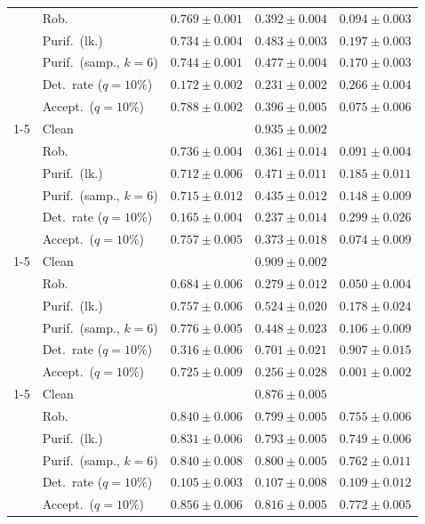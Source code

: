 \begin{tabular}{@{}llrrr@{}}
 & Rob. & $0.769 \pm 0.001$ & $0.392 \pm 0.004$ & $0.094 \pm 0.003$ \\
 & Purif.\ (lk.) & $0.734 \pm 0.004$ & $0.483 \pm 0.003$ & $0.197 \pm 0.003$ \\
 & Purif.\ (samp., $k{=}6$) & $0.744 \pm 0.001$ & $0.477 \pm 0.004$ & $0.170 \pm 0.003$ \\
 & Det.\ rate ($q{=}10\%$) & $0.172 \pm 0.002$ & $0.231 \pm 0.002$ & $0.266 \pm 0.004$ \\
 & Accept.\ ($q{=}10\%$) & $0.788 \pm 0.002$ & $0.396 \pm 0.005$ & $0.075 \pm 0.006$ \\
\cmidrule(lr){1-5}
\multirow{6}{*}{$\alpha{=}0.5$} & Clean & \multicolumn{3}{c}{$0.935 \pm 0.002$} \\
 & Rob. & $0.736 \pm 0.004$ & $0.361 \pm 0.014$ & $0.091 \pm 0.004$ \\
 & Purif.\ (lk.) & $0.712 \pm 0.006$ & $0.471 \pm 0.011$ & $0.185 \pm 0.011$ \\
 & Purif.\ (samp., $k{=}6$) & $0.715 \pm 0.012$ & $0.435 \pm 0.012$ & $0.148 \pm 0.009$ \\
 & Det.\ rate ($q{=}10\%$) & $0.165 \pm 0.004$ & $0.237 \pm 0.014$ & $0.299 \pm 0.026$ \\
 & Accept.\ ($q{=}10\%$) & $0.757 \pm 0.005$ & $0.373 \pm 0.018$ & $0.074 \pm 0.009$ \\
\cmidrule(lr){1-5}
\multirow{6}{*}{$\alpha{=}1$} & Clean & \multicolumn{3}{c}{$0.909 \pm 0.002$} \\
 & Rob. & $0.684 \pm 0.006$ & $0.279 \pm 0.012$ & $0.050 \pm 0.004$ \\
 & Purif.\ (lk.) & $0.757 \pm 0.006$ & $0.524 \pm 0.020$ & $0.178 \pm 0.024$ \\
 & Purif.\ (samp., $k{=}6$) & $0.776 \pm 0.005$ & $0.448 \pm 0.023$ & $0.106 \pm 0.009$ \\
 & Det.\ rate ($q{=}10\%$) & $0.316 \pm 0.006$ & $\mathbf{0.701 \pm 0.021}$ & $\mathbf{0.907 \pm 0.015}$ \\
 & Accept.\ ($q{=}10\%$) & $0.725 \pm 0.009$ & $0.256 \pm 0.028$ & $0.001 \pm 0.002$ \\
\cmidrule(lr){1-5}
\multirow{6}{*}{AT} & Clean & \multicolumn{3}{c}{$0.876 \pm 0.005$} \\
 & Rob. & $0.840 \pm 0.006$ & $\mathbf{0.799 \pm 0.005}$ & $\mathbf{0.755 \pm 0.006}$ \\
 & Purif.\ (lk.) & $0.831 \pm 0.006$ & $\mathbf{0.793 \pm 0.005}$ & $\mathbf{0.749 \pm 0.006}$ \\
 & Purif.\ (samp., $k{=}6$) & $0.840 \pm 0.008$ & $\mathbf{0.800 \pm 0.005}$ & $\mathbf{0.762 \pm 0.011}$ \\
 & Det.\ rate ($q{=}10\%$) & $0.105 \pm 0.003$ & $0.107 \pm 0.008$ & $0.109 \pm 0.012$ \\
 & Accept.\ ($q{=}10\%$) & $0.856 \pm 0.006$ & $\mathbf{0.816 \pm 0.005}$ & $\mathbf{0.772 \pm 0.005}$ \\
\bottomrule
\end{tabular}
